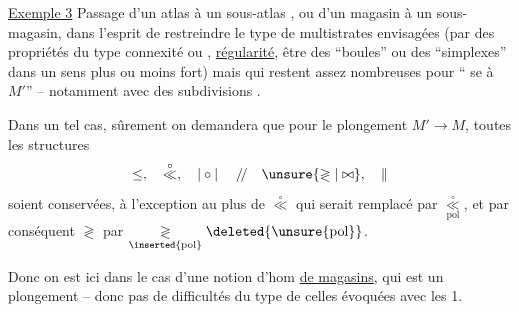 \uline{Exemple 3} Passage d'un atlas  à un sous-atlas , ou d'un magasin à un sous-magasin, dans l'esprit de restreindre le type de multistrates envisagées (par des propriétés du type connexité ou , \uline{régularité}, être  des ``boules'' ou des ``simplexes'' dans un sens plus ou moins fort) mais qui restent assez nombreuses pour `` se  à $M'$'' -- notamment avec des subdivisions .

Dans un tel cas, sûrement on demandera que pour le plongement $M'\longrightarrow M$, toutes les structures
\[
\leq,\quad\overset{\circ}{\ll},\quad\mathrel{|\circ|}\quad/\!/\quad\unsure{\gtrless|\bowtie},\quad\parallel
\]
soient conservées, à l'exception  au plus de $\overset{\circ}{\ll}$ qui serait remplacé par $\underset{\mathrm{pol}}{\overset{\circ}{\ll}}$, et par conséquent $\gtrless$ par $\underset{\inserted{\mathrm{pol}}}{\gtrless}\deleted{\unsure{\mathrm{pol}}}$.

Donc on est ici dans le cas d'une notion d'hom \uline{de magasins}, qui est un plongement -- donc pas de difficultés du type de celles évoquées avec les  1.
